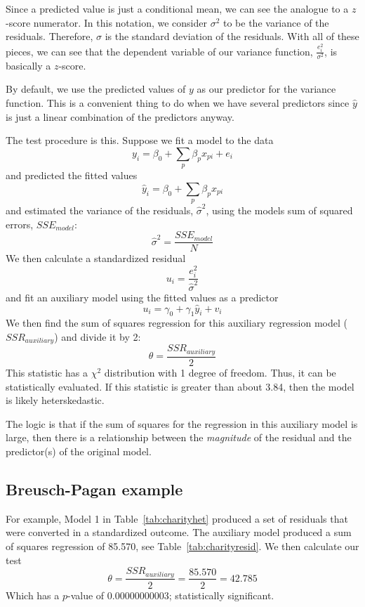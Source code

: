 Since a predicted value is just a conditional mean, we can see the analogue to a $z$-score numerator. In this notation, we consider $\sigma^2$ to be the variance of the residuals. Therefore, $\sigma$ is the standard deviation of the residuals. With all of these pieces, we can see that the dependent variable of our variance function, $\frac{e_i^2}{\sigma^2}$, is basically a $z$-score.

By default, we use the predicted values of $y$ as our predictor for the variance function. This is a convenient thing to do when we have several predictors since $\hat{y}$ is just a linear combination of the predictors anyway.

The test procedure is this. Suppose we fit a model to the data
\[
y_i = \beta_0+\sum_p\beta_px_{pi}+e_i
\]
and predicted the fitted values
\[
\hat{y}_i = \beta_0+\sum_p\beta_px_{pi}
\]
and estimated the variance of the residuals, $\hat{\sigma}^2$, using the models sum of squared errors, $SSE_{model}$:
\begin{equation}
\hat{\sigma}^2=\frac{SSE_{model}}{N}
\end{equation}
We then calculate a standardized residual
\begin{equation}
u_i=\frac{e_i^2}{\hat{\sigma}^2}
\end{equation}
and fit an auxiliary model using the fitted values as a predictor
\[
u_i=\gamma_0+\gamma_1\hat{y}_i+v_i
\]
We then find the sum of squares regression for this auxiliary regression model ($SSR_{auxiliary}$) and divide it by 2:
\begin{equation}
\theta=\frac{SSR_{auxiliary}}{2}
\end{equation}
This statistic has a $\chi^2$ distribution with 1 degree of freedom. Thus, it can be statistically evaluated. If this statistic is greater than about 3.84, then the model is likely heterskedastic.

The logic is that if the sum of squares for the regression in this auxiliary model is large, then there is a relationship between the {\it magnitude} of the residual and the predictor(s) of the original model.

\subsection{Breusch-Pagan example}

For example, Model 1 in Table~\ref{tab:charityhet} produced a set of residuals that were converted in a standardized outcome. The auxiliary model produced a sum of squares regression of 85.570, see Table~\ref{tab:charityresid}. We then calculate our test
\[
\theta=\frac{SSR_{auxiliary}}{2}=\frac{85.570}{2}=42.785
\]
Which has a $p$-value of 0.00000000003; statistically significant.

